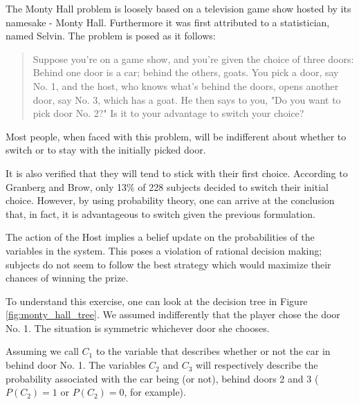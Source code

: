 The Monty Hall problem is loosely based on a television game show hosted by its namesake - Monty Hall. Furthermore it was first attributed to a statistician, named Selvin. The problem is posed as it follows:
\begin{quotation}
Suppose you're on a game show, and you're given the choice of three doors: Behind one door is a car; behind the others, goats. You pick a door, say No. 1, and the host, who knows what's behind the doors, opens another door, say No. 3, which has a goat. He then says to you, "Do you want to pick door No. 2?" Is it to your advantage to switch your choice?
\end{quotation}

Most people, when faced with this problem, will be indifferent about whether to switch or to stay with the initially picked door.
 
It is also verified that they will tend to stick with their first choice. According to Granberg and Brow\cite{Granberg1995}, only 13\% of 228 subjects decided to switch their initial choice. However, by using probability theory, one can arrive at the conclusion that, in fact, it is advantageous to switch given the previous formulation.
 
The action of the Host implies a belief update on the probabilities of the variables in the system. This poses a violation of rational decision making; subjects do not seem to follow the best strategy which would maximize their chances of winning the prize. 

To understand this exercise, one can look at the decision tree in Figure \ref{fig:monty_hall_tree}. We assumed indifferently that the player chose the door No. 1. The situation is symmetric whichever door she chooses. 


Assuming we call $C_{1}$ to the variable that describes whether or not the car in behind door No. 1. The variables $C_{2}$ and $C_{3}$ will respectively describe the probability associated with the car being (or not), behind doors 2 and 3 ($P(C_{2})=1$ or $P(C_{2})=0$, for example).

